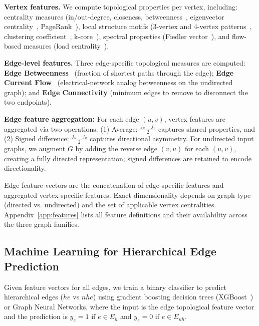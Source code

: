 \documentclass{article}
\begin{document}
    \textbf{Vertex features.} We compute topological properties per vertex, including: centrality measures (in/out-degree, closeness, betweenness~\citep{freeman1978centrality,freeman1977set}, eigenvector centrality~\citep{bonacich1972technique}, PageRank~\citep{page1999pagerank}), local structure motifs (3-vertex and 4-vertex patterns~\citep{milo2002network}, clustering coefficient~\citep{watts1998collective}, k-core~\citep{seidman1983network}), spectral properties (Fiedler vector~\citep{fiedler1975property}), and flow-based measures (load centrality~\citep{newman2001scientific}).

    \textbf{Edge-level features.} Three edge-specific topological measures are computed: \textbf{Edge Betweenness}~\citep{newman2005measure} (fraction of shortest paths through the edge); \textbf{Edge Current Flow}~\citep{brandes2005centrality} (electrical-network analog betweenness on the undirected graph); and \textbf{Edge Connectivity} (minimum edges to remove to disconnect the two endpoints).

    \textbf{Edge feature aggregation:} For each edge $(u, v)$, vertex features are aggregated via two operations: (1) Average: $\frac{f_{u}+f_{v}}{2}$ captures shared properties, and (2) Signed difference: $\frac{f_{u}-f_{v}}{2}$ captures directional asymmetry. For undirected input graphs, we augment $G$ by adding the reverse edge $(v,u)$ for each $(u,v)$, creating a fully directed representation; signed differences are retained to encode directionality.

    Edge feature vectors are the concatenation of edge-specific features and aggregated vertex-specific features. Exact dimensionality depends on graph type (directed vs. undirected) and the set of applicable vertex centralities. Appendix~\ref{app:features} lists all feature definitions and their availability across the three graph families.

    \subsection{Machine Learning for Hierarchical Edge Prediction}
    Given feature vectors for all edges, we train a binary classifier to predict hierarchical edges ($he$ vs $nhe$) using gradient boosting decision trees (XGBoost~\citep{chen2016xgboost}) or Graph Neural Networks, where the input is the edge topological feature vector and the prediction is $y_{e}= 1$ if $e \in E_{h}$ and $y_{e}= 0$ if $e \in E_{nh}$.
\end{document}
